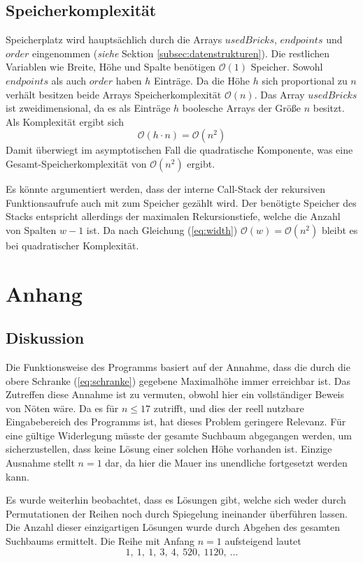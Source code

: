 \documentclass[a4paper, 12pt]{scrartcl}
\begin{document}
\subsection{Speicherkomplexität}
Speicherplatz wird hauptsächlich durch die Arrays $usedBricks$, $endpoints$ und $order$ eingenommen (\emph{siehe} Sektion \ref{subsec:datenstrukturen}). Die restlichen Variablen wie Breite, Höhe und Spalte benötigen $\mathcal{O}(1)$ Speicher. Sowohl $endpoints$ als auch $order$ haben $h$ Einträge. Da die Höhe $h$ sich proportional zu $n$ verhält besitzen beide Arrays Speicherkomplexität $\mathcal{O}(n)$. Das Array $usedBricks$ ist zweidimensional, da es als Einträge $h$ boolesche Arrays der Größe $n$ besitzt. Als Komplexität ergibt sich
\begin{equation*}
	\mathcal{O}(h \cdot n) = \mathcal{O}(n^2)
\end{equation*}
Damit überwiegt im asymptotischen Fall die quadratische Komponente, was eine Gesamt-Speicherkomplexität von $\mathcal{O}(n^2)$ ergibt.

Es könnte argumentiert werden, dass der interne Call-Stack der rekursiven Funktionsaufrufe auch mit zum Speicher gezählt wird. Der benötigte Speicher des Stacks entspricht allerdings der maximalen Rekursionstiefe, welche die Anzahl von Spalten $w-1$ ist. Da nach Gleichung (\ref{eq:width}) $\mathcal{O}(w) = \mathcal{O}(n^2)$ bleibt es bei quadratischer Komplexität.
\newpage
\section{Anhang}
\subsection*{Diskussion}
Die Funktionsweise des Programms basiert auf der Annahme, dass die durch die obere Schranke (\ref{eq:schranke}) gegebene Maximalhöhe immer erreichbar ist. Das Zutreffen diese Annahme ist zu vermuten, obwohl hier ein vollständiger Beweis von Nöten wäre. Da es für $n \le 17$ zutrifft, und dies der reell nutzbare Eingabebereich des Programms ist, hat dieses Problem geringere Relevanz. Für eine gültige Widerlegung müsste der gesamte Suchbaum abgegangen werden, um sicherzustellen, dass keine Lösung einer solchen Höhe vorhanden ist. Einzige Ausnahme stellt $n=1$ dar, da hier die Mauer ins unendliche fortgesetzt werden kann.

Es wurde weiterhin beobachtet, dass es Lösungen gibt, welche sich weder durch Permutationen der Reihen noch durch Spiegelung ineinander überführen lassen. Die Anzahl dieser einzigartigen Lösungen wurde durch Abgehen des gesamten Suchbaums ermittelt. Die Reihe mit Anfang $n=1$ aufsteigend lautet
\begin{equation*}
	1,\ 1,\ 1,\ 3,\ 4,\ 520,\ 1120,\ \dots
\end{equation*}
\end{document}
